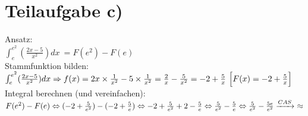 \documentclass[11pt, a4paper]{report}
\begin{document}
	\section{Teilaufgabe c)}
	Ansatz:
	\\
	$\int_{e}^{e^2} (\frac{2x - 5}{x^2}) dx\ = F(e^2) - F(e)$
	\\
	Stammfunktion bilden:
	\\
	$
	\int_{e}^{e^2} (\frac{2x - 5}{x^2}) dx \Rightarrow f(x) = 2x \times \frac{1}{x^2} - 5 \times \frac{1}{x^2} = \frac{2}{x} - \frac{5}{x^2} = -2 + \frac{5}{x}\ \Bigl[F(x) = -2 + \frac{5}{x}\Bigl]
	$
	\\
	Integral berechnen (und vereinfachen):
	\\
	$
	F(e^2) - F(e) \\
	\Leftrightarrow (-2 + \frac{5}{e^2}) - (-2 + \frac{5}{e}) \\
	\Leftrightarrow -2 + \frac{5}{e^2} + 2 - \frac{5}{e} \\
	\Leftrightarrow \frac{5}{e^2} - \frac{5}{e} \\
	\Leftrightarrow \frac{5}{e^2} - \frac{5e}{e^2} \\
	\xrightarrow[]{CAS}\ \approx 
	$
	
\end{document}
